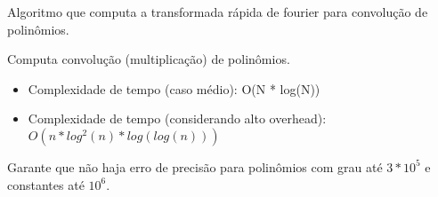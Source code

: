 \documentclass[11pt, a4paper, oneside]{book}
\begin{document}
Algoritmo que computa a transformada rápida de fourier para convolução de polinômios.



Computa convolução (multiplicação) de polinômios.



\begin{itemize}
\item Complexidade de tempo (caso médio): O(N * log(N))
\item Complexidade de tempo (considerando alto overhead): $O(n * log^2(n) * log(log(n)))$
\end{itemize}



Garante que não haja erro de precisão para polinômios com grau até $3 * 10^5$ e constantes até $10^6$.
\hfill
\end{document}
